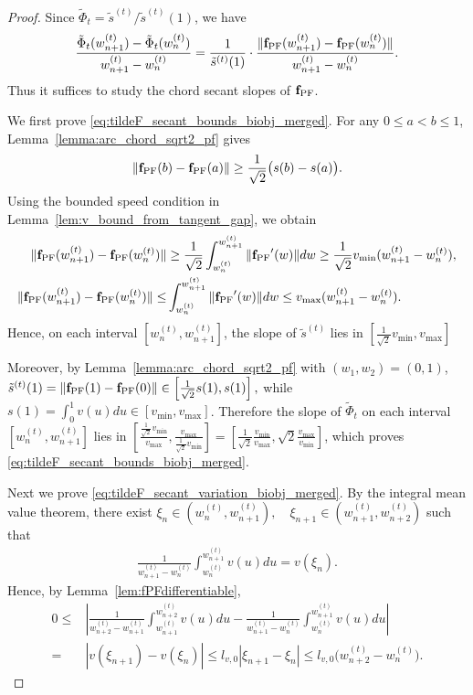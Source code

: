 \documentclass{article}
\newcommand{\fPF}{{\mathbf{f}_{\rm PF}}}
\newcommand{\Farc}{\Phi}
\begin{document}
\begin{proof}
Since $\tilde \Farc_t=\tilde s^{(t)}/\tilde s^{(t)}(1)$, we have
\begin{align}
\frac{\tilde \Farc_t(w_{n+1}^{(t)})-\tilde \Farc_t(w_n^{(t)})}{w_{n+1}^{(t)}-w_n^{(t)}}
=
\frac{1}{\tilde s^{(t)}(1)}
\cdot
\frac{\|\fPF(w_{n+1}^{(t)})-\fPF(w_n^{(t)})\|}{w_{n+1}^{(t)}-w_n^{(t)}}.
\label{eq:tildeF_secant_as_chord_merged}
\end{align}
Thus it suffices to study the chord secant slopes of $\fPF$.

We first prove \eqref{eq:tildeF_secant_bounds_biobj_merged}.
For any $0\le a<b\le 1$, Lemma~\ref{lemma:arc_chord_sqrt2_pf} gives
\begin{align}
\|\fPF(b)-\fPF(a)\|
\ge
\frac{1}{\sqrt2}\bigl(s(b)-s(a)\bigr).
\label{eq:chord_ge_arc_over_sqrt2_merged}
\end{align}
Using the bounded speed condition in Lemma~\ref{lem:v_bound_from_tangent_gap}, we obtain
\begin{align}
\|\fPF(w_{n+1}^{(t)})-\fPF(w_n^{(t)})\|
&\ge
\frac{1}{\sqrt2}\int_{w_n^{(t)}}^{w_{n+1}^{(t)}}\|\fPF'(w)\| dw
\ge
\frac{1}{\sqrt2}v_{\min}(w_{n+1}^{(t)}-w_n^{(t)}),
\label{eq:seg_lower_merged}
\\
\|\fPF(w_{n+1}^{(t)})-\fPF(w_n^{(t)})\|
\leq &
\int_{w_n^{(t)}}^{w_{n+1}^{(t)}}\|\fPF'(w)\| dw
\le
v_{\max}(w_{n+1}^{(t)}-w_n^{(t)}).
\label{eq:seg_upper_merged}
\end{align}
Hence, on each interval $[w_n^{(t)},w_{n+1}^{(t)}]$, the slope of $\tilde s^{(t)}$ lies in $\left[\frac{1}{\sqrt2}v_{\min}, v_{\max}\right]$

Moreover, by Lemma~\ref{lemma:arc_chord_sqrt2_pf} with $(w_1,w_2)=(0,1)$,
$
\tilde s^{(t)}(1)=\|\fPF(1)-\fPF(0)\|
\in
\left[\frac{1}{\sqrt2}s(1), s(1)\right],
$
while
$s(1)=\int_0^1 v(u) du\in [v_{\min},v_{\max}]$.
Therefore the slope of $\tilde \Farc_t$ on each interval $[w_n^{(t)},w_{n+1}^{(t)}]$ lies in
$\left[\frac{\frac{1}{\sqrt2}v_{\min}}{v_{\max}},\frac{v_{\max}}{\frac{1}{\sqrt2}v_{\min}}\right]=\left[\frac{1}{\sqrt2}\frac{v_{\min}}{v_{\max}},\sqrt2\frac{v_{\max}}{v_{\min}}\right]$, which proves \eqref{eq:tildeF_secant_bounds_biobj_merged}.

Next we prove \eqref{eq:tildeF_secant_variation_biobj_merged}. By the integral mean value theorem, there exist
$
\xi_n\in(w_n^{(t)},w_{n+1}^{(t)}), \quad \xi_{n+1}\in(w_{n+1}^{(t)},w_{n+2}^{(t)})
$ such that
\begin{align}
\frac{1}{w_{n+1}^{(t)}-w_n^{(t)}}\int_{w_n^{(t)}}^{w_{n+1}^{(t)}} v(u) du = v(\xi_n). \label{eq:ivt_speed_merged}
\end{align}
Hence, by Lemma~\ref{lem:fPFdifferentiable},
\begin{align}
    0 \le & \left| \frac{1}{w_{n+2}^{(t)}-w_{n+1}^{(t)}}\int_{w_{n+1}^{(t)}}^{w_{n+2}^{(t)}} v(u) du - \frac{1}{w_{n+1}^{(t)}-w_n^{(t)}}\int_{w_n^{(t)}}^{w_{n+1}^{(t)}} v(u) du \right| \nonumber\\
    = &  |v(\xi_{n+1})-v(\xi_n)| \le l_{v,0}|\xi_{n+1}-\xi_n| \le l_{v,0}\bigl(w_{n+2}^{(t)}-w_n^{(t)}\bigr).
    \label{eq:avg_speed_jump_merged}
\end{align}


\end{proof}
\end{document}
